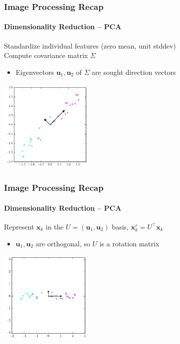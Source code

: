 \documentclass[xetex,professionalfont]{beamer}
\renewcommand{\vec}[1]{\ensuremath{\mathbf{#1}}}
\newcommand{\vu}{\vec{u}}
\newcommand{\vx}{\vec{x}}
\begin{document}
\begin{frame}
\frametitle{Image Processing Recap}
\framesubtitle{Dimensionality Reduction -- PCA}

Standardize individual features (zero mean, unit stddev)\\\medskip  %
Compute covariance matrix $\Sigma$
\begin{itemize}
    \item Eigenvectors $\vu_1,\vu_2$ of $\Sigma$ are sought direction vectors
\end{itemize}

\begin{center}
\includegraphics[width=4.5cm]{figures/pca-eigenvectors.pdf}
\end{center}

\end{frame}


\begin{frame}
\frametitle{Image Processing Recap}
\framesubtitle{Dimensionality Reduction -- PCA}

Represent $\vx_k$ in the $U=(\vu_1,\vu_2)$ basis, $\vx^r_k=U^\top\vx_k$
\begin{itemize}
    \item $\vu_1,\vu_2$ are orthogonal, so $U$ is a rotation matrix %
\end{itemize}

\begin{center}
\includegraphics[width=4.5cm]{figures/pca-rotated.pdf}
\end{center}

\end{frame}
\end{document}
